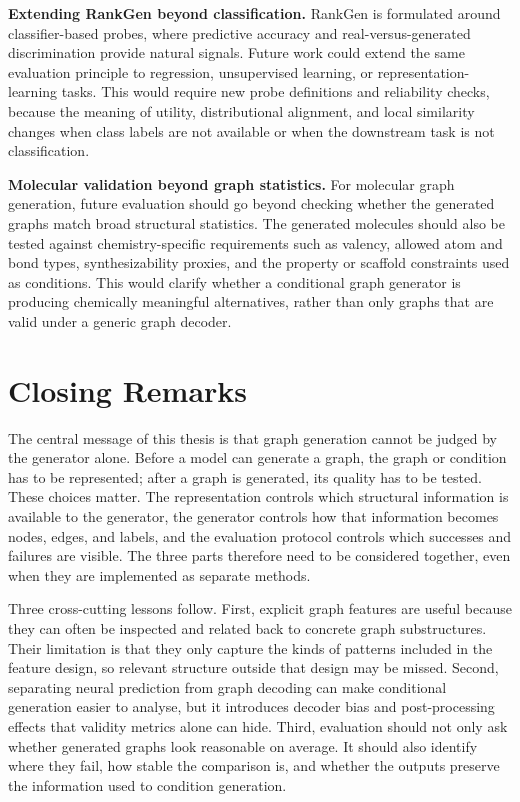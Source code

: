 \textbf{Extending RankGen beyond classification.}
RankGen is formulated around classifier-based probes, where predictive accuracy
and real-versus-generated discrimination provide natural signals. Future work
could extend the same evaluation principle to regression, unsupervised
learning, or representation-learning tasks. This would require new probe
definitions and reliability checks, because the meaning of utility,
distributional alignment, and local similarity changes when class labels are
not available or when the downstream task is not classification.

\textbf{Molecular validation beyond graph statistics.}
For molecular graph generation, future evaluation should go beyond checking
whether the generated graphs match broad structural statistics. The generated
molecules should also be tested against chemistry-specific requirements such as
valency, allowed atom and bond types, synthesizability proxies, and the
property or scaffold constraints used as conditions. This would clarify whether
a conditional graph generator is producing chemically meaningful alternatives,
rather than only graphs that are valid under a generic graph decoder.

\section{Closing Remarks}
\label{sec:conclusion:closing}

The central message of this thesis is that graph generation cannot be judged by
the generator alone. Before a model can generate a graph, the graph or condition
has to be represented; after a graph is generated, its quality has to be tested.
These choices matter. The representation controls which structural information
is available to the generator, the generator controls how that information
becomes nodes, edges, and labels, and the evaluation protocol controls which
successes and failures are visible. The three parts therefore need to be
considered together, even when they are implemented as separate methods.

Three cross-cutting lessons follow. First, explicit graph features are useful
because they can often be inspected and related back to concrete graph
substructures. Their limitation is that they only capture the kinds of patterns
included in the feature design, so relevant structure outside that design may
be missed. Second, separating neural prediction from graph decoding can make
conditional generation easier to analyse, but it introduces decoder bias and
post-processing effects that validity metrics alone can hide. Third,
evaluation should not only ask whether generated graphs look reasonable on
average. It should also identify where they fail, how stable the comparison is,
and whether the outputs preserve the information used to condition generation.

